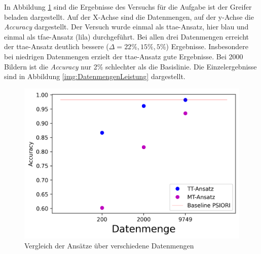 	In Abbildung \ref{img:VergleichDatenmenge} sind die Ergebnisse des Versuchs für die Aufgabe ist der Greifer beladen dargestellt. Auf der X-Achse sind die Datenmengen, auf der y-Achse die \textit{Accuracy} dargestellt. Der Versuch wurde einmal als \ac{ttae}-Ansatz, hier blau und einmal als \ac{tfae}-Ansatz (lila) durchgeführt. Bei allen drei Datenmengen erreicht der \ac{ttae}-Ansatz deutlich bessere ($\Delta=22\%,15\%,5\%$) Ergebnisse. Insbesondere bei niedrigen Datenmengen erzielt der \ac{ttae}-Ansatz gute Ergebnisse. Bei 2000 Bildern ist die \textit{Accuracy} nur 2\% schlechter als die Basislinie. Die Einzelergebnisse sind in Abbildung \ref{img:DatenmengenLeistung} dargestellt.   
	\begin{figure}[h]
		\centering
		\includegraphics[width=1\textwidth, center]{bilder/Hauptteil/Transfer_Logs_Datenmenge/Acc_compare_Logs_data.png}
		\caption{Vergleich der Ansätze über verschiedene Datenmengen}
		\label{img:VergleichDatenmenge}
	\end{figure}  	
